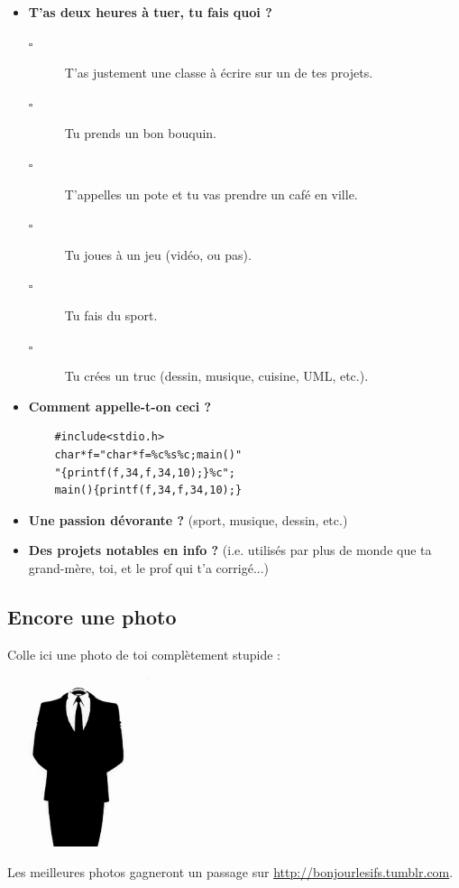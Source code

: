 \begin{itemize}
    \item \textbf{T'as deux heures à tuer, tu fais quoi ?}
    \begin{description}
	\item[$\square$] T'as justement une classe à écrire sur un de tes projets.
	\item[$\square$] Tu prends un bon bouquin.
	\item[$\square$] T'appelles un pote et tu vas prendre un café en ville.
	\item[$\square$] Tu joues à un jeu (vidéo, ou pas).
	\item[$\square$] Tu fais du sport.
	\item[$\square$] Tu crées un truc (dessin, musique, cuisine, UML, etc.).
    \end{description}
	\vspace{2em}
\columnbreak	
    \item \textbf{Comment appelle-t-on ceci ?}
    \begin{verbatim}
	#include<stdio.h>
	char*f="char*f=%c%s%c;main()"
	"{printf(f,34,f,34,10);}%c";
	main(){printf(f,34,f,34,10);}
    \end{verbatim}
    \vspace{8cm}
	
    \item \textbf{Une passion dévorante ?} (sport, musique, dessin, etc.)
    \vspace{6cm}
	
    \item \textbf{Des projets notables en info ?} (i.e. utilisés par plus de monde que ta grand-mère, toi, et le prof qui t'a corrigé...)
    \vspace{6cm}

\end{itemize}

\newpage
\subsection*{Encore une photo}
Colle ici une photo de toi complètement stupide :
\begin{center}
\includegraphics[height=5cm, angle=120]{images/anonymous.jpg}
\end{center}
Les meilleures photos gagneront un passage sur
\url{http://bonjourlesifs.tumblr.com}.


